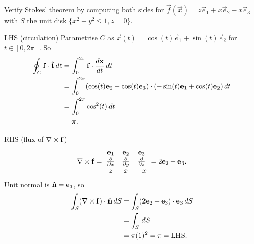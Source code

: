 \documentclass[10pt, a4paper]{article}
\begin{document}
\begin{example}
    Verify Stokes' theorem by computing both sides for $\vec{f}(\vec{x}) = z\vec{e}_1 + x\vec{e}_2 - x\vec{e}_3$ with $S$ the unit disk $\{x ^ 2 + y ^ 2 \leq 1, z = 0\}$.

    LHS
    (circulation)
    Parametrise $C$ as $\vec{x}(t) = \cos(t)\vec{e}_1 + \sin(t)\vec{e}_2$ for $t \in [0, 2\pi]$.
    So
    \begin{align*}
        \oint_{C}\mathbf{f}\cdot\mathbf{\hat{t}}\,d\ell &= \int_{0}^{2\pi}\mathbf{f}\cdot\frac{d\mathbf{x}}{dt}\,dt \\
        &= \int_{0}^{2\pi}(\cos(t)\mathbf{e}_2 - \cos(t)\mathbf{e}_3)\cdot(-\sin(t)\mathbf{e}_1 + \cos(t)\mathbf{e}_2)\,dt \\
        &= \int_{0}^{2\pi}\cos ^ 2(t)\,dt \\
        &= \pi.
    \end{align*}

    RHS
    (flux of $\mathbf{\nabla} \times \mathbf{f}$)
    \[
    \mathbf{\nabla} \times \mathbf{f} = \begin{vmatrix}
        \mathbf{e}_1 & \mathbf{e}_2 & \mathbf{e}_3 \\
        \frac{\partial }{\partial x} & \frac{\partial }{\partial y} & \frac{\partial }{\partial z} \\
        z & x & -x
    \end{vmatrix} = 2\mathbf{e}_2 + \mathbf{e}_3.
    \]
    Unit normal is $\mathbf{\hat{n}} = \mathbf{e}_3$,
    so
    \begin{align*}
        \int_{S}(\mathbf{\nabla} \times \mathbf{f})\cdot\mathbf{\hat{n}}\,dS &= \int_{S}(2\mathbf{e}_2 + \mathbf{e}_3)\cdot\mathbf{e}_3\,dS \\
        &= \int_{S}\,dS \\
        &= \pi(1) ^ 2 = \pi = \text{LHS}.
    \end{align*}
\end{example}
\end{document}
